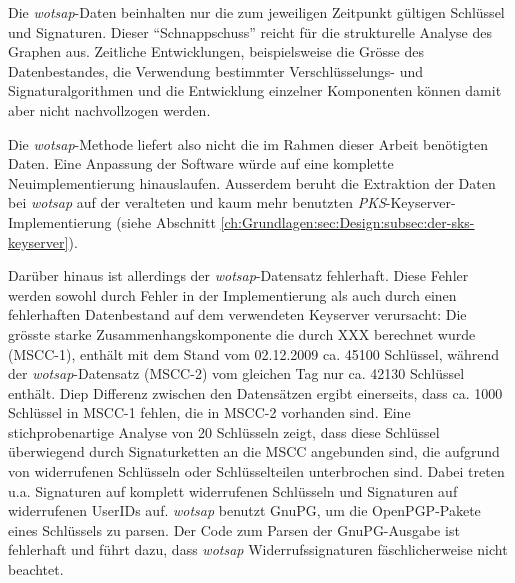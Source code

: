 Die \emph{wotsap}-Daten beinhalten nur die zum jeweiligen Zeitpunkt
gültigen Schlüssel und Signaturen. Dieser "`Schnappschuss"' reicht für
die strukturelle Analyse des Graphen aus. Zeitliche Entwicklungen,
beispielsweise die Grösse des Datenbestandes, die Verwendung
bestimmter Verschlüsselungs- und Signaturalgorithmen und die Entwicklung
einzelner Komponenten können damit aber nicht nachvollzogen werden.

Die \emph{wotsap}-Methode liefert also nicht die im Rahmen dieser
Arbeit benötigten Daten. Eine Anpassung der Software würde auf eine
komplette Neuimplementierung hinauslaufen. Ausserdem beruht die
Extraktion der Daten bei \emph{wotsap} auf der veralteten und kaum
mehr benutzten \emph{PKS}-Keyserver-Implementierung (siehe Abschnitt
\ref{ch:Grundlagen:sec:Design:subsec:der-sks-keyserver}).

Darüber hinaus ist allerdings der \emph{wotsap}-Datensatz
fehlerhaft. Diese Fehler werden sowohl durch Fehler in der
Implementierung als auch durch einen fehlerhaften Datenbestand auf dem
verwendeten Keyserver verursacht: Die grösste starke
Zusammenhangskomponente die durch XXX berechnet %
wurde (MSCC-1), enthält mit dem Stand vom 02.12.2009 ca. 45100
Schlüssel, während der \emph{wotsap}-Datensatz (MSCC-2) vom gleichen
Tag nur ca. 42130 Schlüssel enthält. Diep Differenz zwischen den
Datensätzen ergibt einerseits, dass ca. 1000 Schlüssel in MSCC-1
fehlen, die in MSCC-2 vorhanden sind. Eine stichprobenartige Analyse
von 20 Schlüsseln zeigt, dass diese Schlüssel überwiegend durch
Signaturketten an die MSCC angebunden sind, die aufgrund von
widerrufenen Schlüsseln oder Schlüsselteilen unterbrochen sind. Dabei
treten u.a. Signaturen auf komplett widerrufenen Schlüsseln und
Signaturen auf widerrufenen UserIDs auf. \emph{wotsap} benutzt GnuPG,
um die OpenPGP-Pakete eines Schlüssels zu parsen. Der Code zum Parsen
der GnuPG-Ausgabe ist fehlerhaft und führt dazu, dass \emph{wotsap}
Widerrufssignaturen fäschlicherweise nicht beachtet.

